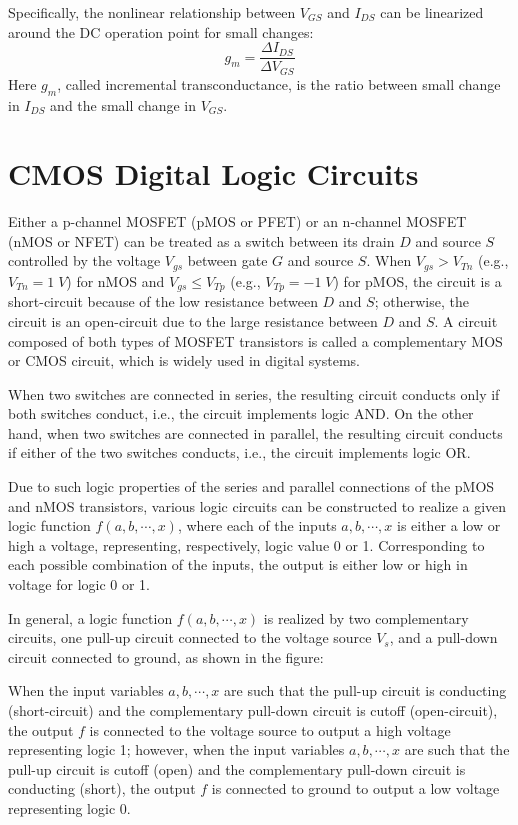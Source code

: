 
Specifically, the nonlinear relationship between $V_{GS}$ and $I_{DS}$ can 
be linearized around the DC operation point for small changes:
\[ g_m=\frac{\Delta I_{DS}}{\Delta V_{GS}} \]
Here $g_m$, called incremental transconductance, is the ratio between small 
change in $I_{DS}$ and the small change in $V_{GS}$.

\section{CMOS Digital Logic Circuits}

Either a p-channel MOSFET (pMOS or PFET) or an n-channel MOSFET (nMOS or NFET)
can be treated as a switch between its drain $D$ and source $S$ controlled by
the voltage $V_{gs}$ between gate $G$ and source $S$. When $V_{gs}>V_{Tn}$ 
(e.g.,  $V_{Tn}=1\;V$) for nMOS and $V_{gs}\le V_{Tp}$ (e.g.,  $V_{Tp}=-1\;V$)
for pMOS, the circuit is a short-circuit because of the low resistance between 
$D$ and $S$; otherwise, the circuit is an open-circuit due to the large 
resistance between $D$ and $S$. A circuit composed of both types of MOSFET 
transistors is called a complementary MOS or CMOS circuit, which is widely
used in digital systems.

When two switches are connected in series, the resulting circuit conducts 
only if both switches conduct, i.e., the circuit implements logic AND. On 
the other hand, when two switches are connected in parallel, the resulting 
circuit conducts if either of the two switches conducts, i.e., the circuit 
implements logic OR.

Due to such logic properties of the series and parallel connections of the
pMOS and nMOS transistors, various logic circuits can be constructed to 
realize a given logic function $f(a,b,\cdots,x)$, where each of the inputs
$a,b,\cdots,x$ is either a low or high a voltage, representing, respectively,
logic value 0 or 1. Corresponding to each possible combination of the inputs,
the output is either low or high in voltage for logic 0 or 1.

In general, a logic function $f(a,b,\cdots,x)$ is realized by two complementary
circuits, one pull-up circuit connected to the voltage source $V_s$, and a 
pull-down circuit connected to ground, as shown in the figure:


When the input variables $a,b,\cdots,x$ are such that the pull-up circuit is
conducting (short-circuit) and the complementary pull-down circuit is cutoff 
(open-circuit), the output $f$ is connected to the voltage source to output a 
high voltage representing logic 1; however, when the input variables $a,b,\cdots,x$ 
are such that the pull-up circuit is cutoff (open) and the complementary pull-down
circuit is conducting (short), the output $f$ is connected to ground to output
a low voltage representing logic 0.


